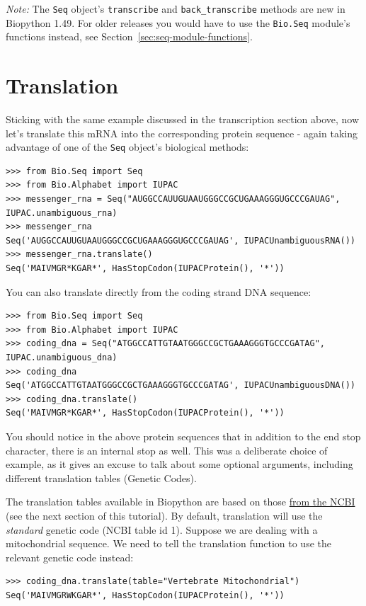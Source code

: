 \documentclass{report}
\begin{document}
\emph{Note:} The \verb|Seq| object's \verb|transcribe| and \verb|back_transcribe| methods
are new in Biopython 1.49.  For older releases you would have to use the \verb|Bio.Seq|
module's functions instead, see Section~\ref{sec:seq-module-functions}.

\section{Translation}
\label{sec:translation}
Sticking with the same example discussed in the transcription section above,
now let's translate this mRNA into the corresponding protein sequence - again taking
advantage of one of the \verb|Seq| object's biological methods:

\begin{verbatim}
>>> from Bio.Seq import Seq
>>> from Bio.Alphabet import IUPAC
>>> messenger_rna = Seq("AUGGCCAUUGUAAUGGGCCGCUGAAAGGGUGCCCGAUAG", IUPAC.unambiguous_rna)
>>> messenger_rna
Seq('AUGGCCAUUGUAAUGGGCCGCUGAAAGGGUGCCCGAUAG', IUPACUnambiguousRNA())
>>> messenger_rna.translate()
Seq('MAIVMGR*KGAR*', HasStopCodon(IUPACProtein(), '*'))
\end{verbatim}

You can also translate directly from the coding strand DNA sequence:
\begin{verbatim}
>>> from Bio.Seq import Seq
>>> from Bio.Alphabet import IUPAC
>>> coding_dna = Seq("ATGGCCATTGTAATGGGCCGCTGAAAGGGTGCCCGATAG", IUPAC.unambiguous_dna)
>>> coding_dna
Seq('ATGGCCATTGTAATGGGCCGCTGAAAGGGTGCCCGATAG', IUPACUnambiguousDNA())
>>> coding_dna.translate()
Seq('MAIVMGR*KGAR*', HasStopCodon(IUPACProtein(), '*'))
\end{verbatim}

You should notice in the above protein sequences that in addition to the end stop character, there is an internal stop as well.  This was a deliberate choice of example, as it gives an excuse to talk about some optional arguments, including different translation tables (Genetic Codes).

The translation tables available in Biopython are based on those \href{http://www.ncbi.nlm.nih.gov/Taxonomy/Utils/wprintgc.cgi}{from the NCBI} (see the next section of this tutorial).  By default, translation will use the \emph{standard} genetic code (NCBI table id 1).
Suppose we are dealing with a mitochondrial sequence.  We need to tell the translation function to use the relevant genetic code instead:
\begin{verbatim}
>>> coding_dna.translate(table="Vertebrate Mitochondrial")
Seq('MAIVMGRWKGAR*', HasStopCodon(IUPACProtein(), '*'))
\end{verbatim}
\end{document}
